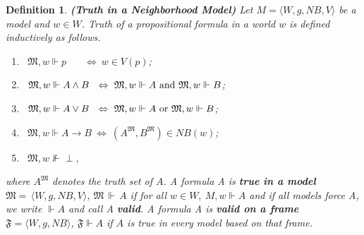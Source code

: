 \documentclass[12pt]{article}
\newtheorem{dfn}[thm]{Definition}
\begin{document}
\begin{dfn}
\label{truth}
\textbf{(Truth in a Neighborhood Model)} Let $ M=\langle W, g, N\!B,V \rangle $ be a model and $ w\in W$. Truth of a propositional formula in a world $w$ is defined inductively as follows.
\begin{enumerate}

\item ~$\mathfrak{M},w \Vdash p~~~~~~ ~~\Leftrightarrow~ w \in V(p)$;

\item ~$ \mathfrak{M},w \Vdash A\wedge B~~\Leftrightarrow~ \mathfrak{M},w \Vdash A ~{\rm and}~ \mathfrak{M},w \Vdash B$;

\item ~$ \mathfrak{M},w \Vdash A\vee B~~\Leftrightarrow ~\mathfrak{M},w \Vdash A ~{\rm or}~ \mathfrak{M},w \Vdash B$;

\item ~$ \mathfrak{M},w \Vdash A\rightarrow B~\Leftrightarrow ~  \left(  A^{\mathfrak{M}}, B^{\mathfrak{M}}\right)   \in N\!B(w)$;

\item ~$ \mathfrak{M},w \nVdash \perp,$
\end{enumerate}
where $ A^{\mathfrak{M}} $ denotes the truth set of $ A $.
A formula A is \textbf{true in a model} $\mathfrak{M}{=}\,\langle W, g, N\!B, V\rangle $, $\mathfrak{M}\,{\Vdash}\,A$ if for all $ w \in W, ~M, w \Vdash A $ and if all models force A, we write $ \Vdash A $ and call A \textbf{valid}. A formula A  is \textbf{valid on a frame}  $ \mathfrak{F}=\langle W, g, N\!B\rangle $, $ \mathfrak{F}\Vdash A $ if $ A $ is true in every model based on that frame.
\end{dfn}
\end{document}
